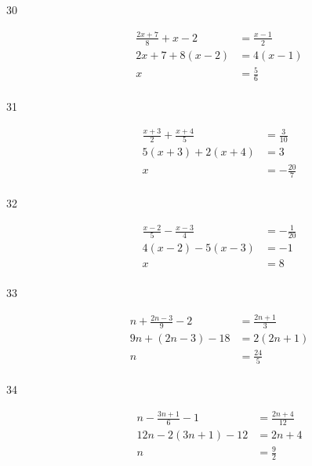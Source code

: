\documentclass[letterpaper]{exam}
\begin{document}
\begin{description}
      \item[30]
        \begin{align*}
          \frac{2x + 7}{8} + x - 2 & = \frac{x-1}{2} \\
          2x + 7 + 8(x - 2)        & = 4(x - 1) \\
          x                        & = \boxed{ \frac{5}{6} } \\
        \end{align*}

      \item[31]
        \begin{align*}
          \frac{x + 3}{2} + \frac{x + 4}{5} & = \frac{3}{10} \\
          5(x + 3) + 2(x + 4)               & = 3 \\
          x                                 & = \boxed{ -\frac{20}{7} } \\
        \end{align*}


      \item[32]
        \begin{align*}
          \frac{x - 2}{5} - \frac{x - 3}{4} & = -\frac{1}{20} \\
          4(x - 2) - 5(x - 3)               & = -1 \\
          x                                 & = \boxed{ 8 } \\
        \end{align*}

      \item[33]
        \begin{align*}
          n + \frac{2n - 3}{9} - 2 & = \frac{2n + 1}{3} \\
          9n + (2n - 3) - 18       & = 2 (2n + 1) \\
          n                        & = \boxed{ \frac{24}{5} } \\
        \end{align*}

      \item[34]
        \begin{align*}
          n - \frac{3n + 1}{6} - 1 & = \frac{2n + 4}{12} \\
          12n - 2(3n + 1) - 12     & = 2n + 4 \\
          n                        & = \boxed{ \frac{9}{2} } \\
        \end{align*}


\end{description}
\end{document}
